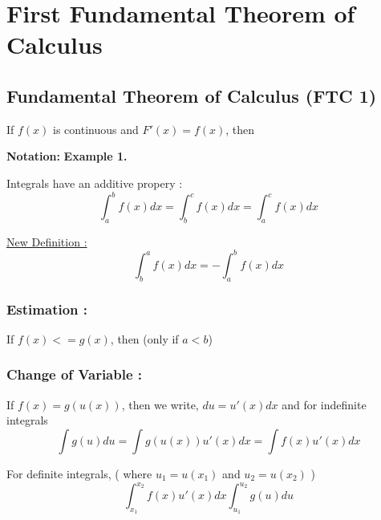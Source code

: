 

\chapter{First Fundamental Theorem of Calculus}
\bigbreak

\section{Fundamental Theorem of Calculus (FTC 1)}

\begin{mdframed}
\begin{center}
    If $f(x)$ is continuous and $F'(x) = f(x)$, then \\
\end{center}
\end{mdframed}

{\bf Notation: } 
\bigbreak
{\bf Example 1.}  
\bigbreak

Integrals have an additive propery : 
$$
    \int_a^b f(x) dx = \int_b^c f(x) dx = \int_a^c f(x) dx
$$

\underline{New Definition : }
$$
    \int_b^a f(x) dx = - \int_a^b f(x) dx
$$


\subsection{Estimation : }
If $f(x) <= g(x)$, then  (only if $a < b$)

\subsection{Change of Variable : }
If $f(x) = g(u(x))$, then we write, $du = u'(x)dx$ and for indefinite integrals
$$ \int g(u) du = \int g(u(x)) u'(x) dx = \int f(x)u'(x)dx $$

For definite integrals, ( where $u_1 = u(x_1)$ and $u_2 = u(x_2)$ ) 
$$ \int_{x_1}^{x_2} f(x)u'(x)dx \int_{u_1}^{u_2} g(u) du $$
